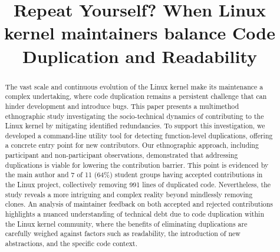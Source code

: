 \documentclass[10pt,conference]{IEEEtran}
\begin{document}
\title{Repeat Yourself? When Linux kernel maintainers balance Code Duplication and Readability}



\author{}


\maketitle

\begin{abstract}
The vast scale and continuous evolution of the Linux kernel make its maintenance a complex undertaking, where code duplication remains a persistent challenge that can hinder development and introduce bugs. This paper presents a multimethod ethnographic study investigating the socio-technical dynamics of contributing to the Linux kernel by mitigating identified redundancies. To support this investigation, we developed a command-line utility tool for detecting function-level duplications, offering a concrete entry point for new contributors. Our ethnographic approach, including participant and non-participant observations, demonstrated that addressing duplications is viable for lowering the contribution barrier. This point is evidenced by the main author and 7 of 11 (64\%) student groups having accepted contributions in the Linux project, collectively removing 991 lines of duplicated code. Nevertheless, the study reveals a more intriguing and complex reality beyond mindlessly removing clones. An analysis of maintainer feedback on both accepted and rejected contributions highlights a nuanced understanding of technical debt due to code duplication within the Linux kernel community, where the benefits of eliminating duplications are carefully weighed against factors such as readability, the introduction of new abstractions, and the specific code context.
\end{abstract}
\end{document}
